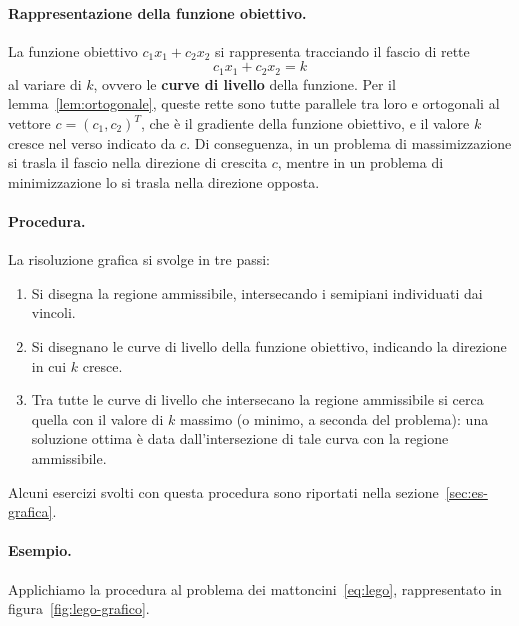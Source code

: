 \paragraph{Rappresentazione della funzione obiettivo.}
La funzione obiettivo $c_1 x_1 + c_2 x_2$ si rappresenta tracciando il fascio di rette
\[
c_1 x_1 + c_2 x_2 = k
\]
al variare di $k$, ovvero le \textbf{curve di livello} della funzione. Per il lemma~\ref{lem:ortogonale}, queste rette sono tutte parallele tra loro e ortogonali al vettore $c = (c_1, c_2)^T$, che è il gradiente della funzione obiettivo, e il valore $k$ cresce nel verso indicato da $c$. Di conseguenza, in un problema di massimizzazione si trasla il fascio nella direzione di crescita $c$, mentre in un problema di minimizzazione lo si trasla nella direzione opposta.

\paragraph{Procedura.}
La risoluzione grafica si svolge in tre passi:
\begin{enumerate}
    \item Si disegna la regione ammissibile, intersecando i semipiani individuati dai vincoli.
    \item Si disegnano le curve di livello della funzione obiettivo, indicando la direzione in cui $k$ cresce.
    \item Tra tutte le curve di livello che intersecano la regione ammissibile si cerca quella con il valore di $k$ massimo (o minimo, a seconda del problema): una soluzione ottima è data dall'intersezione di tale curva con la regione ammissibile.
\end{enumerate}

Alcuni esercizi svolti con questa procedura sono riportati nella sezione~\ref{sec:es-grafica}.

\paragraph{Esempio.}
Applichiamo la procedura al problema dei mattoncini~\eqref{eq:lego}, rappresentato in figura~\ref{fig:lego-grafico}.

